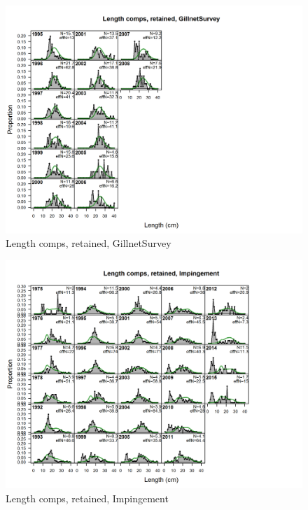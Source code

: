 \documentclass[12pt,]{article}
\begin{document}
\begin{figure}[htbp]
\centering
\includegraphics{./r4ss/plots_mod1/comp_lenfit_flt9mkt2.png}
\caption{Length comps, retained, GillnetSurvey
\label{fig:mod1_11_comp_lenfit_flt9mkt2}}
\end{figure}

\begin{figure}[htbp]
\centering
\includegraphics{./r4ss/plots_mod1/comp_lenfit_flt10mkt2.png}
\caption{Length comps, retained, Impingement
\label{fig:mod1_12_comp_lenfit_flt10mkt2}}
\end{figure}
\end{document}
